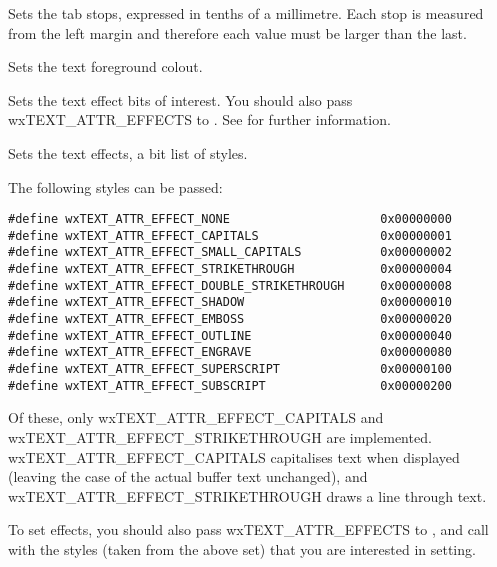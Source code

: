 Sets the tab stops, expressed in tenths of a millimetre.
Each stop is measured from the left margin and therefore each value must be larger than the last.

\label{wxrichtextattrsettextcolour}


Sets the text foreground colout.

\label{wxrichtextattrsettexteffectflags}


Sets the text effect bits of interest. You should also pass wxTEXT\_ATTR\_EFFECTS to .
See  for further information.

\label{wxrichtextattrsettexteffects}


Sets the text effects, a bit list of styles.

The following styles can be passed:

{\small
\begin{verbatim}
#define wxTEXT_ATTR_EFFECT_NONE                     0x00000000
#define wxTEXT_ATTR_EFFECT_CAPITALS                 0x00000001
#define wxTEXT_ATTR_EFFECT_SMALL_CAPITALS           0x00000002
#define wxTEXT_ATTR_EFFECT_STRIKETHROUGH            0x00000004
#define wxTEXT_ATTR_EFFECT_DOUBLE_STRIKETHROUGH     0x00000008
#define wxTEXT_ATTR_EFFECT_SHADOW                   0x00000010
#define wxTEXT_ATTR_EFFECT_EMBOSS                   0x00000020
#define wxTEXT_ATTR_EFFECT_OUTLINE                  0x00000040
#define wxTEXT_ATTR_EFFECT_ENGRAVE                  0x00000080
#define wxTEXT_ATTR_EFFECT_SUPERSCRIPT              0x00000100
#define wxTEXT_ATTR_EFFECT_SUBSCRIPT                0x00000200
\end{verbatim}
}

Of these, only wxTEXT\_ATTR\_EFFECT\_CAPITALS and wxTEXT\_ATTR\_EFFECT\_STRIKETHROUGH are implemented.
wxTEXT\_ATTR\_EFFECT\_CAPITALS capitalises text when displayed (leaving the case of the actual buffer
text unchanged), and wxTEXT\_ATTR\_EFFECT\_STRIKETHROUGH draws a line through text.

To set effects, you should also pass wxTEXT\_ATTR\_EFFECTS to , and call\rtfsp
{} with the styles (taken from the
above set) that you are interested in setting.

